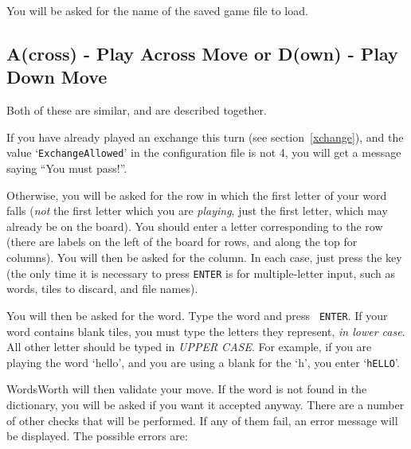 You will be asked for the name of the saved game file to load.

\subsection{A(cross) - Play Across Move or D(own) - Play Down Move}

Both of these are similar, and are described together.

If you have already played an exchange this turn (see section~\ref{xchange}),
and the value `{\tt ExchangeAllowed}' in the configuration file is not 4, you will 
get a message saying ``You must pass!''.  

Otherwise, you will be asked for the row in which the first
letter of your word falls ({\em not} the first letter which you
are {\em playing}, just the first letter, which may already be on 
the board). You should enter a letter corresponding to the row
(there are labels on the left of the board for rows, and along the
top for columns). You will then be asked for the column. In each 
case, just press the key (the only time it is necessary to press
{\tt ENTER} is for multiple-letter input, such as words, tiles to discard,
and file names).

You will then be asked for the word. Type the word and press {\tt
ENTER}.
If your word contains blank tiles, you must type the letters they
represent, {\em in lower case}. All other letter should be typed in
{\em UPPER CASE}. For example, if you are playing the word `hello',
and you are using a blank for the `h', you enter `{\tt hELLO}'.

WordsWorth will then validate your move. If the word is not found in
the dictionary, you will be asked if you want it accepted anyway.
There are a number of other checks that will be performed. If any of
them fail, an error message will be displayed. The possible errors
are:

